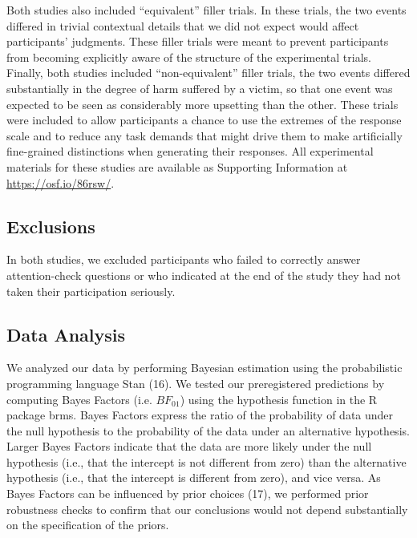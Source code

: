 \documentclass[9pt,twocolumn,twoside,]{pnas-new}
\begin{document}
{Both studies also included ``equivalent'' filler trials. In these
trials, the two events differed in trivial contextual details that we
did not expect would affect participants' judgments. These filler trials
were meant to prevent participants from becoming explicitly aware of the
structure of the experimental trials. Finally, both studies included
``non-equivalent'' filler trials, the two events differed substantially
in the degree of harm suffered by a victim, so that one event was
expected to be seen as considerably more upsetting than the other. These
trials were included to allow participants a chance to use the extremes
of the response scale and to reduce any task demands that might drive
them to make artificially fine-grained distinctions when generating
their responses. All experimental materials for these studies are
available as Supporting Information at \url{https://osf.io/86rsw/}.

\subsection*{Exclusions}\label{exclusions}

In both studies, we excluded participants who failed to correctly answer
attention-check questions or who indicated at the end of the study they
had not taken their participation seriously.

\subsection*{Data Analysis}\label{data-analysis}

We analyzed our data by performing Bayesian estimation using the
probabilistic programming language Stan (16). We tested our
preregistered predictions by computing Bayes Factors (i.e. \(BF_{01}\))
using the hypothesis function in the R package brms. Bayes Factors
express the ratio of the probability of data under the null hypothesis
to the probability of the data under an alternative hypothesis. Larger
Bayes Factors indicate that the data are more likely under the null
hypothesis (i.e., that the intercept is not different from zero) than
the alternative hypothesis (i.e., that the intercept is different from
zero), and vice versa. As Bayes Factors can be influenced by prior
choices (17), we performed prior robustness checks to confirm that our
conclusions would not depend substantially on the specification of the
priors.

}
\end{document}
